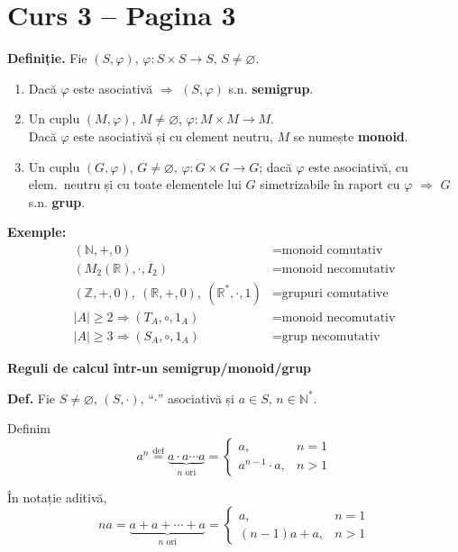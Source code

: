 \documentclass[12pt]{article}
\begin{document}
\section*{Curs 3 -- Pagina 3}

\noindent\textbf{Definiție.} Fie $(S,\varphi)$, $\varphi : S \times S \to S$, $S \neq \varnothing$.

\begin{enumerate}
\item[(1)] Dacă $\varphi$ este asociativă $\Rightarrow$ $(S,\varphi)$ s.n. \textbf{semigrup}.

\item[(2)] Un cuplu $(M,\varphi)$, $M \neq \varnothing$, $\varphi : M \times M \to M$.\\
Dacă $\varphi$ este asociativă și cu element neutru, $M$ se numește \textbf{monoid}.

\item[(3)] Un cuplu $(G,\varphi)$, $G \neq \varnothing$, $\varphi : G \times G \to G$; dacă $\varphi$ este asociativă, cu elem.\ neutru și cu toate elementele lui $G$ simetrizabile în raport cu $\varphi$ $\Rightarrow$ $G$ s.n. \textbf{grup}.
\end{enumerate}

\noindent\textbf{Exemple:}
\begin{align*}
(\mathbb{N},+,0) &= \text{monoid comutativ} \\
(M_2(\mathbb{R}), \cdot, I_2) &= \text{monoid necomutativ} \\
(\mathbb{Z},+,0),\ (\mathbb{R},+,0),\ (\mathbb{R}^*,\cdot,1) &= \text{grupuri comutative} \\
|A| \geq 2 \Rightarrow (T_A,\circ,1_A) &= \text{monoid necomutativ} \\
|A| \geq 3 \Rightarrow (S_A,\circ,1_A) &= \text{grup necomutativ}
\end{align*}

\noindent\textbf{Reguli de calcul într-un semigrup/monoid/grup}

\noindent\textbf{Def.} Fie $S \neq \varnothing$, $(S,\cdot)$, ``$\cdot$'' asociativă și $a \in S$, $n \in \mathbb{N}^*$.

\noindent Definim
\[
a^n \overset{\text{def}}{=} \underbrace{a \cdot a \cdots a}_{n \text{ ori}} =
\begin{cases}
a, & n=1 \\
a^{n-1}\cdot a, & n>1
\end{cases}
\]

\noindent În notație aditivă,
\[
na = \underbrace{a+a+\cdots+a}_{n \text{ ori}} =
\begin{cases}
a, & n=1 \\
(n-1)a+a, & n>1
\end{cases}
\]
\end{document}

